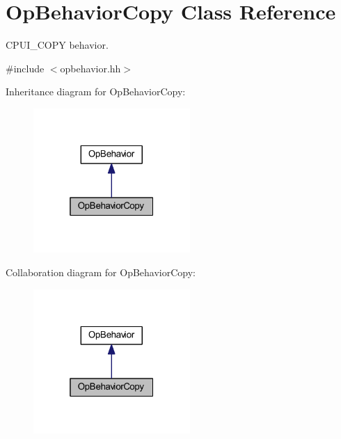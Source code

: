 \hypertarget{class_op_behavior_copy}{}\section{Op\+Behavior\+Copy Class Reference}
\label{class_op_behavior_copy}


C\+P\+U\+I\+\_\+\+C\+O\+PY behavior.  




{\ttfamily \#include $<$opbehavior.\+hh$>$}



Inheritance diagram for Op\+Behavior\+Copy\+:
\nopagebreak
\begin{figure}[H]
\begin{center}
\leavevmode
\includegraphics[width=169pt]{class_op_behavior_copy__inherit__graph}
\end{center}
\end{figure}


Collaboration diagram for Op\+Behavior\+Copy\+:
\nopagebreak
\begin{figure}[H]
\begin{center}
\leavevmode
\includegraphics[width=169pt]{class_op_behavior_copy__coll__graph}
\end{center}
\end{figure}
